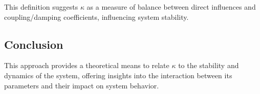 \documentclass{article}
\begin{document}
This definition suggests \( \kappa \) as a measure of balance between direct influences and coupling/damping coefficients, influencing system stability.

\subsection{Conclusion}
This approach provides a theoretical means to relate \( \kappa \) to the stability and dynamics of the system, offering insights into the interaction between its parameters and their impact on system behavior.
\end{document}

